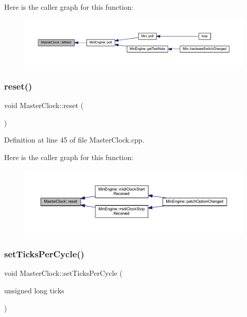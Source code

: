 Here is the caller graph for this function\+:
\nopagebreak
\begin{figure}[H]
\begin{center}
\leavevmode
\includegraphics[width=350pt]{class_master_clock_ae6c0b35db2932b94ec823eac80347707_icgraph}
\end{center}
\end{figure}
\mbox{\label{class_master_clock_a21abae82a775a527de35a198859ce965}} 
\subsubsection{\texorpdfstring{reset()}{reset()}}
{\footnotesize\ttfamily void Master\+Clock\+::reset (\begin{DoxyParamCaption}{ }\end{DoxyParamCaption})}



Definition at line 45 of file Master\+Clock.\+cpp.

Here is the caller graph for this function\+:
\nopagebreak
\begin{figure}[H]
\begin{center}
\leavevmode
\includegraphics[width=350pt]{class_master_clock_a21abae82a775a527de35a198859ce965_icgraph}
\end{center}
\end{figure}
\mbox{\label{class_master_clock_a5df4dcf8523b8186a7c73f9357376a01}} 
\subsubsection{\texorpdfstring{set\+Ticks\+Per\+Cycle()}{setTicksPerCycle()}}
{\footnotesize\ttfamily void Master\+Clock\+::set\+Ticks\+Per\+Cycle (\begin{DoxyParamCaption}\item[{unsigned long}]{ticks }\end{DoxyParamCaption})}



